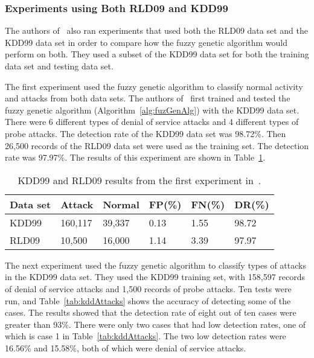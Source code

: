 \documentclass{sig-alternate}
\begin{document}
\subsubsection{Experiments using Both RLD09 and KDD99}
The authors of~\cite{6559603} also ran experiments that used both the RLD09 data set and the KDD99 data set in order to compare how the fuzzy genetic algorithm would perform on both. They used a subset of the KDD99 data set for both the training data set and testing data set.

The first experiment used the fuzzy genetic algorithm to classify normal activity and attacks from both data sets. The authors of~\cite{6559603} first trained and tested the fuzzy genetic algorithm (Algorithm~\ref{alg:fuzGenAlg}) with the KDD99 data set. There were 6 different types of denial of service attacks and 4 different types of probe attacks. The detection rate of the KDD99 data set was 98.72\%. Then 26,500 records of the RLD09 data set were used as the training set. The detection rate was 97.97\%. The results of this experiment are shown in Table~\ref{tab:bothSetsResults}.

\begin{table}
\caption{KDD99 and RLD09 results from the first experiment in~\cite{6559603}.}
\vspace{0.20cm}
\begin{tabular}{llllll}
Data set & Attack & Normal & FP(\%) & FN(\%) & DR(\%)\\ \hline
KDD99 & 160,117 & 39,337 & 0.13 & 1.55 & 98.72\\
RLD09 & 10,500 & 16,000 & 1.14 & 3.39 & 97.97\\
\end{tabular}
\label{tab:bothSetsResults}
\end{table}

The next experiment used the fuzzy genetic algorithm to classify types of attacks in the KDD99 data set. They used the KDD99 training set, with 158,597 records of denial of service attacks and 1,500 records of probe attacks. Ten tests were run, and Table~\ref{tab:kddAttacks} shows the accuracy of detecting some of the cases. The results showed that the detection rate of eight out of ten cases were greater than 93\%. There were only two cases that had low detection rates, one of which is case 1 in Table~\ref{tab:kddAttacks}. The two low detection rates were 16.56\% and 15.58\%, both of which were denial of service attacks.
\end{document}

